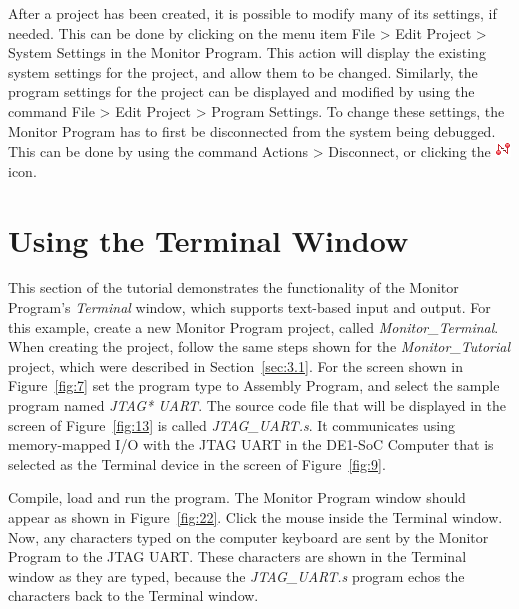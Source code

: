 \documentclass[11pt, twoside, pdftex]{article}
\begin{document}
After a project has been created, it is possible to modify many
of its settings, if needed. This can be done by clicking
on the menu item {\sf File > Edit Project > System Settings} in the Monitor
Program.
This action will display the existing system settings for the
project, and allow them to be changed. Similarly, the program
settings for the project can be displayed and modified by using
the command {\sf File > Edit Project > Program Settings}. To change
these settings, the Monitor Program has to first be disconnected
from the system being debugged. This can be done by using the
command {\sf Actions > Disconnect}, or clicking the
\includegraphics{toolbar/disconnect.png} icon.

\section{Using the Terminal Window}
\label{sec:5}

This section of the tutorial demonstrates the functionality of
the Monitor Program's \emph{Terminal} window, which supports
text-based input and output. For this example, create
a new Monitor Program project, called {\it Monitor\_Terminal}.
When creating the project, follow the same steps shown for the
{\it Monitor\_Tutorial} project, which were described in 
Section~\ref{sec:3.1}. For the screen shown in Figure~\ref{fig:7} set the program
type to {\sf Assembly Program}, and select the
sample program named {\it JTAG* UART}. The source code file that
will be displayed in the screen of Figure~\ref{fig:13} is called 
{\it JTAG\_UART.s}.  It communicates using
memory-mapped I/O with the JTAG UART in the DE1-SoC
Computer that is selected as 
the {\sf Terminal device} in the screen of Figure~\ref{fig:9}.

Compile, load and run the program. The Monitor Program
window should appear as shown in Figure~\ref{fig:22}. 
Click the mouse inside the Terminal window. Now, any characters
typed on the computer keyboard are sent by the Monitor Program to
the JTAG UART. These characters are shown in the Terminal window
as they are typed, because the {\it JTAG\_UART.s} program echos
the characters back to the Terminal window.
\end{document}

